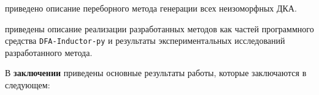 \insection{\ref{sec:findall:backtracking}} приведено описание переборного метода генерации всех неизоморфных ДКА.  

\insection{\ref{sec:findall:results}} приведены описание реализации разработанных методов как частей программного средства \texttt{DFA-Inductor-py} и результаты экспериментальных исследований разработанного метода. 



В \textbf{заключении} приведены основные результаты работы, которые заключаются в следующем:

